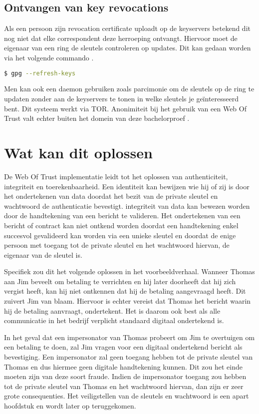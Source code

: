 \subsection{Ontvangen van key revocations}
\label{subsec:ontvangen-van-key-revocations}

Als een persoon zijn revocation certificate uploadt op de keyservers betekend
dit nog niet dat elke correspondent deze herroeping ontvangt. Hiervoor moet de
eigenaar van een ring de sleutels controleren op updates. Dit kan gedaan worden
via het volgende commando \autocite{GnuPGFAQ}.

\begin{lstlisting}[language=bash]
$ gpg --refresh-keys
\end{lstlisting}

Men kan ook een daemon gebruiken zoals parcimonie om de sleutels op de ring te
updaten zonder aan de keyservers te tonen in welke sleutels je geïnteresseerd
bent. Dit systeem werkt via \gls{TOR}. Anonimiteit bij het gebruik van een Web Of
Trust valt echter buiten het domein van deze bachelorproef
\autocite{RiseUpOpenPGPBestPractices}.

\section{Wat kan dit oplossen}
\label{sec:wat-kan-dit-oplossen}

De Web Of Trust implementatie leidt tot het oplossen van \gls{authenticiteit},
\gls{integriteit} en \gls{toerekenbaarheid}. Een identiteit kan bewijzen wie hij of
zij is
door het ondertekenen van data doordat het bezit van de private sleutel en
wachtwoord de authenticatie bevestigt. \Gls{integriteit} van data kan bewezen
worden
door de handtekening van een bericht te valideren. Het ondertekenen van een
bericht of contract kan niet ontkend worden doordat een handtekening enkel
succesvol gevalideerd kan worden via een unieke sleutel en doordat de enige
persoon
met toegang tot de private sleutel en het wachtwoord hiervan, de eigenaar van de
sleutel is.

Specifiek zou dit het volgende oplossen in het voorbeeldverhaal. Wanneer Thomas
aan Jim beveelt om betaling te verrichten en hij later doorheeft dat hij zich
vergist heeft, kan hij niet ontkennen dat hij de betaling aangevraagd heeft. Dit
zuivert Jim van blaam. Hiervoor is echter vereist dat Thomas het bericht waarin
hij de betaling aanvraagt, ondertekent. Het is daarom ook best als alle
communicatie in het bedrijf verplicht standaard digitaal ondertekend is.

In het geval dat een impersonator van Thomas probeert om Jim te overtuigen om
een betaling te doen, zal Jim vragen voor een digitaal ondertekend bericht als
bevestiging. Een impersonator zal geen toegang hebben tot de private sleutel van
Thomas en dus hiermee geen digitale handtekening kunnen. Dit zou het einde
moeten zijn van deze soort fraude. Indien de impersonator toegang zou hebben tot
de private sleutel van Thomas en het wachtwoord hiervan, dan zijn er zeer grote
consequenties. Het veiligstellen van de sleutels en wachtwoord is een apart
hoofdstuk en wordt later op teruggekomen.

